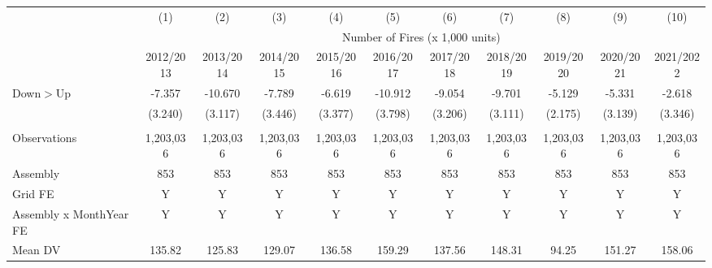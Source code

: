 \begin{tabular}{lcccccccccc} \hline
 & (1) & (2) & (3) & (4) & (5) & (6) & (7) & (8) & (9) & (10) \\
 & \multicolumn{10}{c}{Number of Fires (x 1,000 units)}\\
 & 2012/2013 & 2013/2014 & 2014/2015 & 2015/2016 & 2016/2017 & 2017/2018 & 2018/2019 & 2019/2020 & 2020/2021 & 2021/2022 \\ \hline

Down$>$Up   &      -7.357\sym{**} &     -10.670\sym{***}&      -7.789\sym{**} &      -6.619\sym{*}  &     -10.912\sym{***}&      -9.054\sym{***}&      -9.701\sym{***}&      -5.129\sym{**} &      -5.331\sym{*}  &      -2.618         \\
            &     (3.240)         &     (3.117)         &     (3.446)         &     (3.377)         &     (3.798)         &     (3.206)         &     (3.111)         &     (2.175)         &     (3.139)         &     (3.346)         \\
 &  &  &  &  &  &  &  &  &  &  \\ \hline
Observations&   1,203,036         &   1,203,036         &   1,203,036         &   1,203,036         &   1,203,036         &   1,203,036         &   1,203,036         &   1,203,036         &   1,203,036         &   1,203,036         \\
Assembly    &         853         &         853         &         853         &         853         &         853         &         853         &         853         &         853         &         853         &         853         \\
Grid FE     &           Y         &           Y         &           Y         &           Y         &           Y         &           Y         &           Y         &           Y         &           Y         &           Y         \\
Assembly x MonthYear FE&           Y         &           Y         &           Y         &           Y         &           Y         &           Y         &           Y         &           Y         &           Y         &           Y         \\
Mean DV     &      135.82         &      125.83         &      129.07         &      136.58         &      159.29         &      137.56         &      148.31         &       94.25         &      151.27         &      158.06         \\
\hline
\end{tabular}
